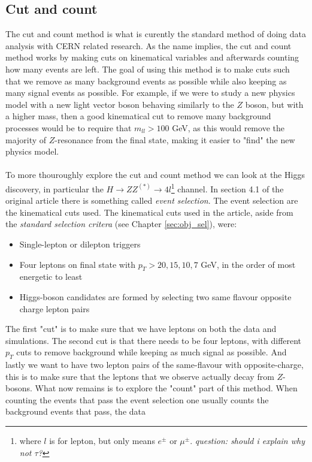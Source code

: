 \documentclass[14pt, a4paper]{book}
\begin{document}
\subsection{Cut and count}
The cut and count method is what is curently the standard method of doing data analysis with CERN related research. As the name implies, the cut and count method works by making cuts on kinematical variables and afterwards counting how many events are left. 
The goal of using this method is to make cuts such that we remove as many background events as possible while also keeping as many signal events as possible. For example, if we were to study a new physics model with a new light vector boson behaving similarly to the $Z$ boson, but with a higher mass, 
then a good kinematical cut to remove many background processes would be to require that $m_{ll}>100$ GeV, as this would remove the majority of $Z$-resonance from the final state, making it easier to "find" the new physics model. \\
\\To more thouroughly explore the cut and count method we can look at the Higgs discovery, in particular the $H\rightarrow ZZ^{(*)} \rightarrow 4l$\footnote{where $l$ is for lepton, but only means $e^\pm$ or $\mu^\pm$. \textit{question: should i explain why not $\tau$?}} channel. 
In section 4.1 of the original article \cite{Higgs_discovery_2012} there is something called \textit{event selection}. The event selection are the kinematical cuts used. The kinematical cuts used in the article, aside from the \textit{standard selection critera} 
(see Chapter \ref{sec:obj_sel}), were:
\begin{itemize}
    \item Single-lepton or dilepton triggers
    \item Four leptons on final state with $p_T >20,15,10,7$ GeV, in the order of most energetic to least
    \item Higgs-boson candidates are formed by selecting two same flavour opposite charge lepton pairs
\end{itemize}
The first "cut" is to make sure that we have leptons on both the data and simulations. The second cut is that there needs to be four leptons, with different $p_T$ cuts to remove background while keeping as much signal as possible. And lastly we want to have two lepton pairs of the same-flavour 
with opposite-charge, this is to make sure that the leptons that we observe actually decay from $Z$-bosons. What now remains is to explore the "count" part of this method. When counting the events that pass the event selection one usually counts the background events that pass, the data 
\end{document}
